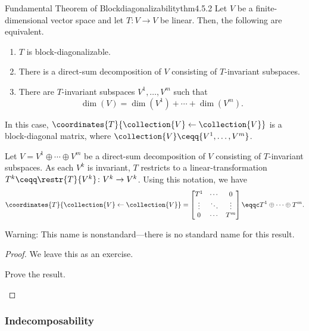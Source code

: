 \begin{thm}{Fundamental Theorem of Block\-diagonalizability}{thm4.5.2}
	Let $V$ be a finite-dimensional vector space and let $T\colon V\rightarrow V$ be linear.  Then, the following are equivalent.
	\begin{enumerate}
		\item $T$ is block-diagonalizable.
		\item There is a direct-sum decomposition of $V$ consisting of $T$-invariant subspaces.
		\item There are $T$-invariant subspaces $V^1,\ldots ,V^m$ such that
		\begin{equation}
		\dim (V)=\dim (V^1)+\cdots +\dim (V^m).
		\end{equation}
	\end{enumerate}
	In this case, $\coordinates{T}{\collection{V}\leftarrow \collection{V}}$ is a block-diagonal matrix, where $\collection{V}\ceqq \{ V^1,\ldots ,V^m\}$.
	\begin{rmk}
		Let $V=V^1\oplus \cdots \oplus V^m$ be a direct-sum decomposition of $V$ consisting of $T$-invariant subspaces.  As each $V^k$ is invariant, $T$ restricts to a linear-transformation $T^k\ceqq \restr{T}{V^k}\colon V^k\rightarrow V^k$.  Using this notation, we have
		\begin{equation}
		\coordinates{T}{\collection{V}\leftarrow \collection{V}}=\begin{bmatrix}T^1 & \cdots & 0 \\ \vdots & \ddots & \vdots \\ 0 & \cdots & T^m\end{bmatrix}\eqqc T^1\oplus \cdots \oplus T^m.
		\end{equation}
	\end{rmk}
	\begin{rmk}
		Warning:  This name is nonstandard---there is no standard name for this result.
	\end{rmk}
	\begin{proof}
		We leave this as an exercise.
		\begin{exr}[breakable=false]{}{}
			Prove the result.
		\end{exr}
	\end{proof}
\end{thm}

\subsubsection{Indecomposability}

